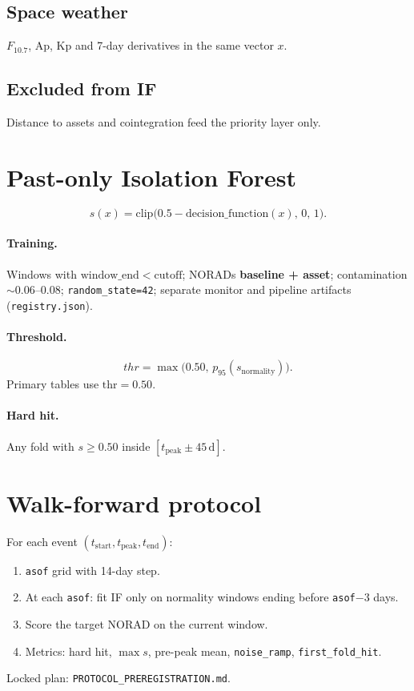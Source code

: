 \documentclass[11pt,a4paper]{article}
\begin{document}
\subsection{Space weather}
\(F_{10.7}\), Ap, Kp and 7-day derivatives in the same vector \(x\).

\subsection{Excluded from IF}
Distance to assets and cointegration feed the priority layer only.

\section{Past-only Isolation Forest}
\label{sec:if}

\begin{equation}
  s(x) = \mathrm{clip}\bigl(0.5 - \mathrm{decision\_function}(x),\, 0,\, 1\bigr).
\end{equation}

\paragraph{Training.}
Windows with \(\mathrm{window\_end}<\mathrm{cutoff}\); NORADs \textbf{baseline + asset}; contamination \(\sim 0.06\)--\(0.08\); \texttt{random\_state=42}; separate monitor and pipeline artifacts (\texttt{registry.json}).

\paragraph{Threshold.}
\begin{equation}
  thr = \max\bigl(0.50,\, p_{95}(s_{\mathrm{normality}})\bigr).
\end{equation}
Primary tables use \(\mathrm{thr}=0.50\).

\paragraph{Hard hit.}
Any fold with \(s\ge 0.50\) inside \([t_{\mathrm{peak}}\pm 45\,\mathrm{d}]\).

\section{Walk-forward protocol}
\label{sec:wf}

For each event \((t_{\mathrm{start}}, t_{\mathrm{peak}}, t_{\mathrm{end}})\):
\begin{enumerate}[leftmargin=*]
  \item \texttt{asof} grid with 14-day step.
  \item At each \texttt{asof}: fit IF only on normality windows ending before \texttt{asof}$-3$ days.
  \item Score the target NORAD on the current window.
  \item Metrics: hard hit, \(\max s\), pre-peak mean, \texttt{noise\_ramp}, \texttt{first\_fold\_hit}.
\end{enumerate}
Locked plan: \texttt{PROTOCOL\_PREREGISTRATION.md}.
\end{document}
